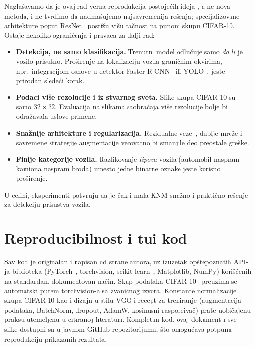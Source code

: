 \documentclass[11pt,a4paper]{article}
\begin{document}
Nagla\v savamo da je ovaj rad verna reprodukcija postoje\'cih ideja
\cite{lecun1998gradient,krizhevsky2012imagenet,simonyan2015very}, a ne nova
metoda, i ne tvrdimo da nadma\v sujemo najsavremenija re\v senja; specijalizovane
arhitekture poput ResNet~\cite{he2016deep} posti\v zu vi\v su ta\v cnost na
punom skupu CIFAR-10. Ostaje nekoliko ograni\v cenja i pravaca za dalji rad:
\begin{itemize}
  \item \textbf{Detekcija, ne samo klasifikacija.} Trenutni model odlu\v cuje
        samo \emph{da li} je vozilo prisutno. Pro\v sirenje na lokalizaciju
        vozila grani\v cnim okvirima, npr.\ integracijom osnove u detektor
        Faster R-CNN~\cite{ren2015faster} ili YOLO~\cite{redmon2016you}, jeste
        prirodan slede\'ci korak.
  \item \textbf{Podaci vi\v se rezolucije i iz stvarnog sveta.} Slike skupa
        CIFAR-10 su samo $32\times 32$. Evaluacija na slikama saobra\'caja vi\v se
        rezolucije bolje bi odra\v zavala uslove primene.
  \item \textbf{Sna\v znije arhitekture i regularizacija.} Rezidualne
        veze~\cite{he2016deep}, dublje mre\v ze i savremene strategije
        augmentacije verovatno bi smanjile deo preostale gre\v ske.
  \item \textbf{Finije kategorije vozila.} Razlikovanje \emph{tipova} vozila
        (automobil naspram kamiona naspram broda) umesto jedne binarne oznake
        jeste korisno pro\v sirenje.
\end{itemize}
U celini, eksperimenti potvr\dj uju da je \v cak i mala KNM sna\v zno i
prakti\v cno re\v senje za detekciju prisustva vozila.

\section*{Reproducibilnost i tu\dj i kod}
Sav kod je originalan i napisan od strane autora, uz izuzetak op\v stepoznatih
API-ja biblioteka (PyTorch~\cite{paszke2019pytorch}, torchvision,
scikit-learn~\cite{pedregosa2011scikit}, Matplotlib, NumPy) kori\v s\'cenih na
standardan, dokumentovan na\v cin. Skup podataka
CIFAR-10~\cite{krizhevsky2009learning} preuzima se automatski putem
torchvision-a sa zvani\v cnog izvora. Konstante normalizacije skupa CIFAR-10 kao
i dizajn u stilu VGG i recept za treniranje (augmentacija podataka, BatchNorm,
dropout, AdamW, kosinusni raspore\dj iva\v c) prate uobi\v cajenu praksu
utemeljenu u citiranoj literaturi. Kompletan kod, ovaj dokument i sve slike
dostupni su u javnom GitHub repozitorijumu, \v sto omogu\'cava potpunu
reprodukciju prikazanih rezultata.



\end{document}
